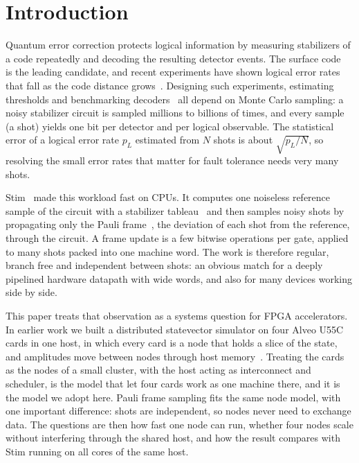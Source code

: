 \section{Introduction}\label{sec:intro}

Quantum error correction protects logical information by measuring stabilizers of a code repeatedly and decoding the
resulting detector events. The surface code~\cite{kitaev2003anyons,dennis2002topological,fowler2012surface} is the
leading candidate, and recent experiments have shown logical error rates that fall as the code distance
grows~\cite{google2023scaling,google2025below}. Designing such experiments, estimating thresholds and benchmarking
decoders~\cite{higgott2022pymatching,higgott2025sparse,delfosse2021unionfind} all depend on Monte Carlo sampling:
a noisy stabilizer circuit is sampled millions to billions of times, and every sample (a shot) yields one bit per
detector and per logical observable. The statistical error of a logical error rate $p_L$ estimated from $N$ shots is
about $\sqrt{p_L/N}$, so resolving the small error rates that matter for fault tolerance needs very many shots.

Stim~\cite{gidney2021stim} made this workload fast on CPUs. It computes one noiseless reference sample of the circuit
with a stabilizer tableau~\cite{gottesman1998heisenberg,aaronson2004chp} and then samples noisy shots by propagating
only the Pauli frame~\cite{knill2005noisy}, the deviation of each shot from the reference, through the circuit. A
frame update is a few bitwise operations per gate, applied to many shots packed into one machine word. The work is
therefore regular, branch free and independent between shots: an obvious match for a deeply pipelined hardware
datapath with wide words, and also for many devices working side by side.

This paper treats that observation as a systems question for FPGA accelerators. In earlier work we built a
distributed statevector simulator on four Alveo U55C cards in one host, in which every card is a node that holds a
slice of the state, and amplitudes move between nodes through host memory~\cite{ali2026multifpga}. Treating the cards
as the nodes of a small cluster, with the host acting as interconnect and scheduler, is the model that let four cards
work as one machine there, and it is the model we adopt here.
Pauli frame sampling fits the same node model, with one important difference: shots are independent, so nodes never
need to exchange data. The questions are then how fast one node can run, whether four nodes scale without
interfering through the shared host, and how the result compares with Stim running on all cores of the same host.


